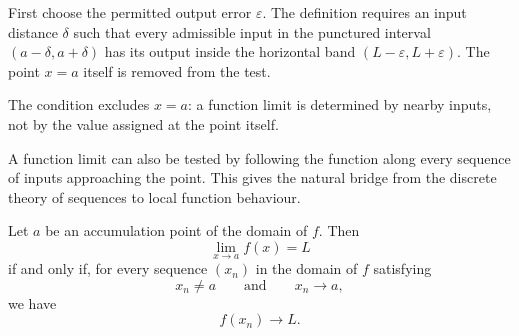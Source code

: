 \begin{interpretationbox}
First choose the permitted output error $\varepsilon$. The definition requires an input distance $\delta$ such that every admissible input in the punctured interval $(a-\delta,a+\delta)$ has its output inside the horizontal band $(L-\varepsilon,L+\varepsilon)$. The point $x=a$ itself is removed from the test.
\end{interpretationbox}

The condition excludes $x=a$: a function limit is determined by nearby inputs, not by the value assigned at the point itself.

A function limit can also be tested by following the function along every sequence of inputs approaching the point. This gives the natural bridge from the discrete theory of sequences to local function behaviour.

\begin{theorembox}
Let $a$ be an accumulation point of the domain of $f$. Then
\[
\lim_{x\to a}f(x)=L
\]
if and only if, for every sequence $(x_n)$ in the domain of $f$ satisfying
\[
x_n\ne a
\qquad\text{and}\qquad
x_n\to a,
\]
we have
\[
f(x_n)\to L.
\]
\end{theorembox}

\begin{center}
\end{center}

